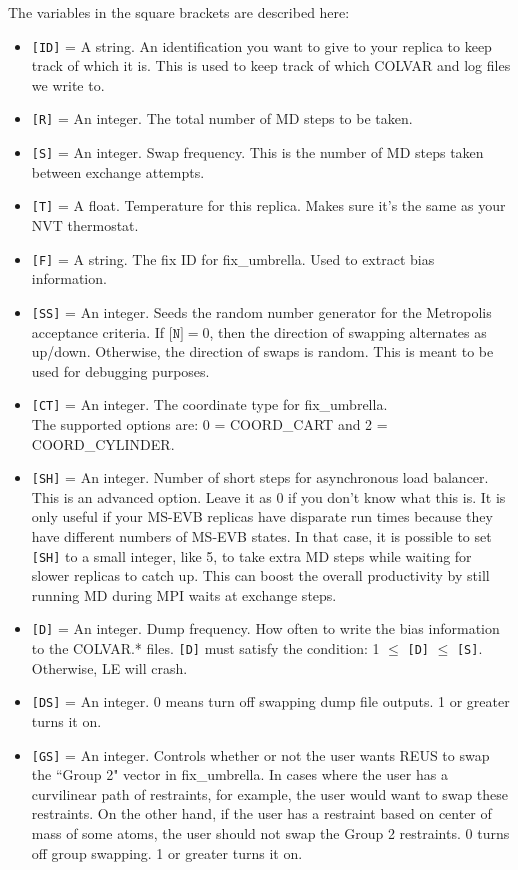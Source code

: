 \documentclass[10pt]{article}
\begin{document}
The variables in the square brackets are described here:
\begin{itemize}
\item	\texttt{[ID]} = A string. An identification you want to give to your replica to keep track of which it is.
		This is used to keep track of which COLVAR and log files we write to.
\item	\texttt{[R]} = An integer. The total number of MD steps to be taken.
\item	\texttt{[S]} = An integer. Swap frequency. This is the number of MD steps taken between exchange attempts.
\item	\texttt{[T]} = A float. Temperature for this replica. Makes sure it's the same as your NVT thermostat.
\item	\texttt{[F]} = A string. The fix ID for fix\_umbrella. Used to extract bias information.
\item	\texttt{[SS]} = An integer. Seeds the random number generator for the Metropolis
		acceptance criteria.
		If $\texttt{[N]} = 0$,
		then the direction of swapping alternates as up/down. Otherwise, the direction of swaps
		is random. This is meant to be used for debugging purposes.
\item	\texttt{[CT]} = An integer. The coordinate type for fix\_umbrella.\\
		The supported options are: 0 = COORD\_CART and 2 = COORD\_CYLINDER.
\item	\texttt{[SH]} = An integer. Number of short steps for asynchronous load balancer. This is an advanced option.
		Leave it as 0 if you don't know what this is. It is only useful if your MS-EVB replicas have disparate run times
		because they have different numbers of MS-EVB states. In that case, it is possible to set \texttt{[SH]} to a
		small integer, like 5, to take extra MD steps while waiting for slower replicas to catch up. This can boost
		the overall productivity by still running MD during MPI waits at exchange steps.
\item	\texttt{[D]} = An integer. Dump frequency. How often to write the bias information to the COLVAR.* files.
		\texttt{[D]} must satisfy the condition: 1 $\le$ \texttt{[D]} $\le$ \texttt{[S]}. Otherwise, LE will crash.
\item	\texttt{[DS]} = An integer. 0 means turn off swapping dump file outputs. 1 or greater turns it on.
\item	\texttt{[GS]} = An integer. Controls whether or not the user wants REUS to swap the ``Group 2" vector
		in fix\_umbrella. In cases where the user has a curvilinear path of restraints, for example, the user 
		would want to swap these restraints. On the other hand, if the user has a restraint based on center of mass
		of some atoms, the user should not swap the Group 2 restraints. 0 turns off group swapping. 1 or greater turns it on.
\end{itemize}
\end{document}
